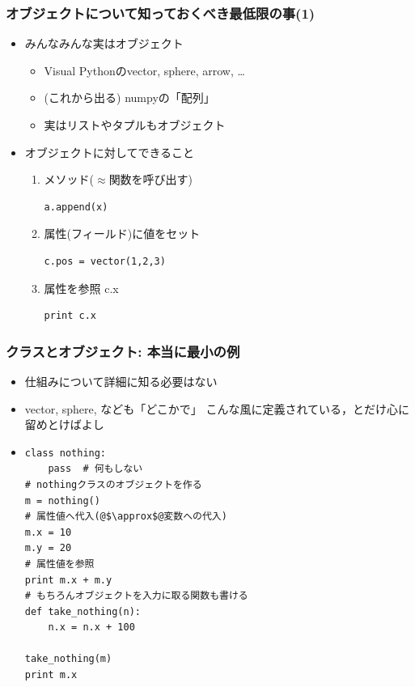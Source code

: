 \documentclass[10pt,dvipdfmx]{beamer}
\begin{document}
\begin{frame}[fragile]
\frametitle{オブジェクトについて知っておくべき最低限の事(1)}

\begin{itemize}
\item みんなみんな実はオブジェクト
  \begin{itemize}
  \item Visual Pythonのvector, sphere, arrow, \ldots
  \item (これから出る) numpyの「配列」
  \item 実はリストやタプルもオブジェクト
  \end{itemize}
\item オブジェクトに対してできること
  \begin{enumerate}
  \item メソッド($\approx$関数を呼び出す) 
\begin{lstlisting}
a.append(x)
\end{lstlisting}
  \item 属性(フィールド)に値をセット 
\begin{lstlisting}
c.pos = vector(1,2,3)
\end{lstlisting}
  \item 属性を参照 c.x
\begin{lstlisting}
print c.x
\end{lstlisting}
\end{enumerate}
\end{itemize}
\end{frame}



\begin{frame}[fragile]
\frametitle{クラスとオブジェクト: 本当に最小の例}
\begin{itemize}
\item 仕組みについて詳細に知る必要はない
\item vector, sphere, なども「どこかで」
  こんな風に定義されている，とだけ心に留めとけばよし
\item []
\begin{lstlisting}
class nothing:
    pass  # 何もしない
# nothingクラスのオブジェクトを作る
m = nothing()
# 属性値へ代入(@$\approx$@変数への代入)
m.x = 10
m.y = 20
# 属性値を参照
print m.x + m.y
# もちろんオブジェクトを入力に取る関数も書ける
def take_nothing(n):
    n.x = n.x + 100

take_nothing(m)
print m.x
\end{lstlisting}
\end{itemize}
\end{frame}
\end{document}
